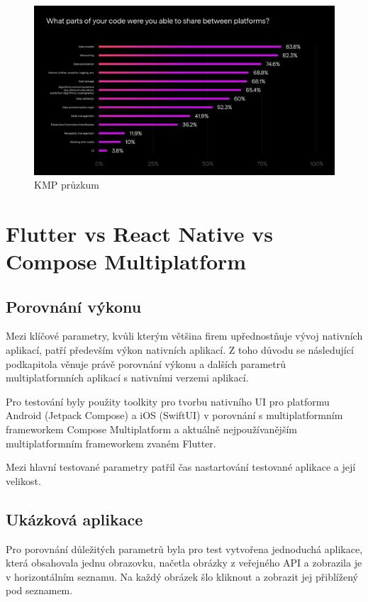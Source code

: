 \begin{figure}[H]
  \centering
  \includegraphics[width=.99\textwidth]{survey-results-q1-q2-22.png}
  \caption{KMP průzkum}
  \label{fig:KMPSurvey}
\end{figure}

\section{Flutter vs React Native vs Compose Multiplatform}


\subsection{Porovnání výkonu}

Mezi klíčové parametry, kvůli kterým většina firem upřednostňuje vývoj nativních aplikací, patří především výkon
nativních aplikací. Z toho důvodu se následující podkapitola věnuje právě porovnání výkonu a dalších parametrů multiplatformních aplikací s
nativními verzemi aplikací. 

Pro testování byly použity toolkity pro tvorbu nativního UI pro platformu Android (Jetpack Compose) a iOS (SwiftUI)
v porovnání s multiplatformním frameworkem Compose Multiplatform a aktuálně nejpoužívanějším multiplatformním
frameworkem zvaném Flutter. \cite{crossPlatformFrameworksStats} 

Mezi hlavní testované parametry patřil čas nastartování testované aplikace a její velikost.

\subsection*{Ukázková aplikace}
Pro porovnání důležitých parametrů byla pro test vytvořena jednoduchá aplikace, která obsahovala jednu obrazovku, 
načetla obrázky z veřejného API a zobrazila je v horizontálním seznamu. 
Na každý obrázek šlo kliknout a zobrazit jej přiblížený pod seznamem. 

